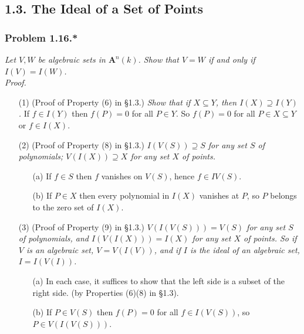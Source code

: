 \documentclass{article}
\begin{document}
\subsection*{1.3. The Ideal of a Set of Points \\}



\subsubsection*{Problem 1.16.*}
\emph{Let $V, W$ be algebraic sets in $\mathbf{A}^n(k)$.
Show that $V = W$ if and only if $I(V) = I(W)$.} \\

\emph{Proof.}
\begin{enumerate}
\item[(1)]
  (Proof of Property (6) in \S 1.3.)
  \emph{Show that if $X \subseteq Y$, then $I(X) \supseteq I(Y)$.}
  If $f \in I(Y)$ then $f(P) = 0$ for all $P \in Y$.
  So $f(P) = 0$ for all $P \in X \subseteq Y$ or $f \in I(X)$.

\item[(2)]
  (Proof of Property (8) in \S 1.3.)
  \emph{$I(V(S)) \supseteq S$ for any set $S$ of polynomials;
  $V(I(X)) \supseteq X$ for any set $X$ of points.}
  \begin{enumerate}
  \item[(a)]
    If $f \in S$ then $f$ vanishes on $V(S)$,
    hence $f \in IV(S)$.

  \item[(b)]
    If $P \in X$ then every polynomial in $I(X)$ vanishes at $P$,
    so $P$ belongs to the zero set of $I(X)$.
  \end{enumerate}

\item[(3)]
  (Proof of Property (9) in \S 1.3.)
  \emph{$V(I(V(S))) = V(S)$ for any set $S$ of polynomials,
  and $I(V(I(X))) = I(X)$ for any set $X$ of points.
  So if $V$ is an algebraic set, $V = V(I(V))$,
  and if $I$ is the ideal of an algebraic set, $I = I(V(I))$.}
  \begin{enumerate}
  \item[(a)]
    In each case, it suffices to show that the left side is a subset of the right side.
    (by Properties (6)(8) in \S 1.3).

  \item[(b)]
    If $P \in V(S)$ then $f(P) = 0$ for all $f \in I(V(S))$, so $P \in V(I(V(S)))$.


\end{enumerate}
\end{enumerate}
\end{document}
